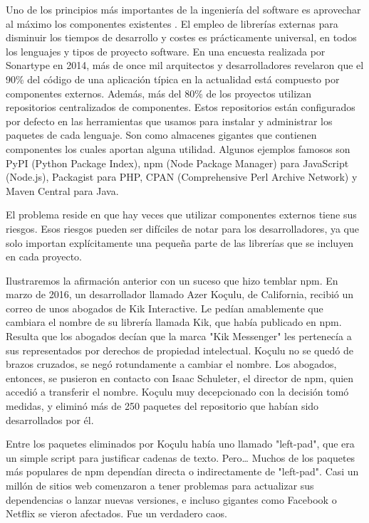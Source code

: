 

Uno de los principios más importantes de la ingeniería del software es aprovechar al máximo los componentes existentes \cite{sametinger1997software}.
El empleo de librerías externas para disminuir los tiempos de desarrollo y costes es prácticamente universal,
en todos los lenguajes y tipos de proyecto software. En una encuesta realizada por Sonartype en 2014, más de once mil arquitectos y
desarrolladores revelaron que el 90\% del código de una aplicación típica en la actualidad está compuesto por componentes externos.
Además, más del 80\% de los proyectos utilizan repositorios centralizados de componentes.
Estos repositorios están configurados por defecto en las herramientas que usamos para instalar y administrar los paquetes de cada lenguaje.
Son como almacenes gigantes que contienen componentes los cuales aportan alguna utilidad.
Algunos ejemplos famosos son PyPI (Python Package Index), npm (Node Package Manager) para JavaScript (Node.js),
Packagist para PHP, CPAN (Comprehensive Perl Archive Network) y Maven Central para Java.


El problema reside en que hay veces que utilizar componentes externos tiene sus riesgos. Esos riesgos pueden ser difíciles de notar para los desarrolladores, ya que solo importan explícitamente una pequeña parte de las librerías que se incluyen en cada proyecto.


Ilustraremos la afirmación anterior con un suceso que hizo temblar npm.
En marzo de 2016, un desarrollador llamado Azer Koçulu, de California, recibió un correo de unos abogados de Kik Interactive.
Le pedían amablemente que cambiara el nombre de su librería llamada Kik, que había publicado en npm.
Resulta que los abogados decían que la marca "Kik Messenger" les pertenecía a sus representados \cite{8998991} por derechos de propiedad intelectual.
Koçulu no se quedó de brazos cruzados, se negó rotundamente a cambiar el nombre.
Los abogados, entonces, se pusieron en contacto con Isaac Schuleter, el director de npm, quien accedió a transferir el nombre.
Koçulu muy decepcionado con la decisión tomó medidas, y eliminó más de 250 paquetes del repositorio que habían sido desarrollados por él.


Entre los paquetes eliminados por Koçulu había uno llamado "left-pad",
que era un simple script para justificar cadenas de texto. Pero… Muchos de los paquetes más populares de npm dependían directa
o indirectamente de "left-pad". Casi un millón de sitios web comenzaron a tener problemas para actualizar sus dependencias o
lanzar nuevas versiones, e incluso gigantes como Facebook o Netflix se vieron afectados. Fue un verdadero caos.


